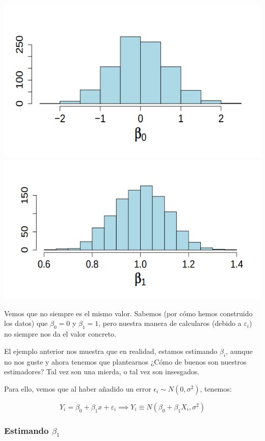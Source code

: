 \begin{itemize}
\begin{example}
\begin{center}
\includegraphics[scale=0.3]{img/1000vecesb0.png}
\includegraphics[scale=0.3]{img/1000vecesb1.png}
\end{center}

Vemos que no siempre es el mismo valor. Sabemos (por cómo hemos construido los datos) que $β_0 = 0$ y $β_1 = 1$, pero nuestra manera de calcularos (debido a $ε_i$) no siempre nos da el valor concreto.


\end{example}

El ejemplo anterior nos muestra que en realidad, estamos estimando $β_i$, aunque no nos guste y ahora tenemos que plantearnos ¿Cómo de buenos son nuestros estimadores? Tal vez son una mierda, o tal vez son insesgados.

Para ello, vemos que al haber añadido un error $\epsilon_i \sim N(0,σ^2)$, tenemos:

\[
Y_i = β_0 + β_1x + ε_i \implies Y_i \equiv N(β_0 + β_1X_i, σ^2)
\]


\subsubsection{Estimando $β_1$}


\end{itemize}
